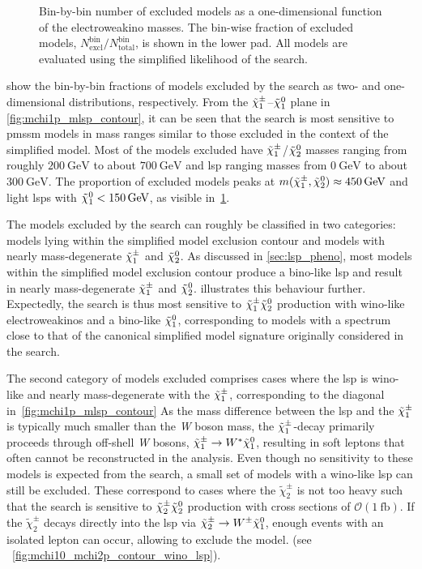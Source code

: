 \begin{figure}
\begin{subfigure}[b]{0.5\linewidth}
	\end{subfigure}\hfill
	\caption{Bin-by-bin number of excluded models as a one-dimensional function of the electroweakino masses. The bin-wise fraction of excluded models, $N^\mathrm{bin}_\mathrm{excl} / N^\mathrm{bin}_\mathrm{total}$, is shown in the lower pad. All models are evaluated using the simplified likelihood of the \onelepton search.}
	\label{fig:impact_electroweakinos_1D}
\end{figure}


 show the bin-by-bin fractions of models excluded by the \onelepton search as two- and one-dimensional distributions, respectively. From the $\tilde{\chi}_1^\pm$--$\tilde{\chi}_1^0$ plane in \cref{fig:mchi1p_mlsp_contour}, it can be seen that the \onelepton search is most sensitive to \gls{pmssm} models in mass ranges similar to those excluded in the context of the simplified model. Most of the models excluded have $\tilde{\chi}_1^\pm$/$\tilde{\chi}_2^0$ masses ranging from roughly $\SI{200}{\GeV}$ to about $\SI{700}{\GeV}$ and \gls{lsp} ranging masses from $\SI{0}{\GeV}$ to about $\SI{300}{\GeV}$. The proportion of excluded models peaks at $m(\charg,\neutr) \approx \SI{450}{\GeV}$ and light \glspl{lsp} with $\lsp < \SI{150}{\GeV}$, as visible in~\cref{fig:impact_electroweakinos_1D}. 

The models excluded by the \onelepton search can roughly be classified in two categories: models lying within the simplified model exclusion contour and models with nearly mass-degenerate $\tilde{\chi}_1^\pm$ and $\tilde{\chi}_2^0$. As discussed in \cref{sec:lsp_pheno}, most models within the simplified model exclusion contour produce a bino-like \gls{lsp} and result in nearly mass-degenerate $\tilde{\chi}_1^\pm$ and $\tilde{\chi}_2^0$.  illustrates this behaviour further. Expectedly, the \onelepton search is thus most sensitive to $\tilde{\chi}_1^\pm\tilde{\chi}_2^0$ production with wino-like electroweakinos and a bino-like $\tilde{\chi}_1^0$, corresponding to models with a spectrum close to that of the canonical simplified model signature originally considered in the search. 

The second category of models excluded comprises cases where the \gls{lsp} is wino-like and nearly mass-degenerate with the $\tilde{\chi}_1^\pm$, corresponding to the diagonal in~\cref{fig:mchi1p_mlsp_contour} As the mass difference between the \gls{lsp} and the $\tilde{\chi}_1^\pm$ is typically much smaller than the \textit{W} boson mass, the $\tilde{\chi}_1^\pm$-decay  primarily proceeds through off-shell \textit{W} bosons, $\tilde{\chi}_1^\pm \rightarrow W^* \tilde{\chi}_1^0$, resulting in soft leptons that often cannot be reconstructed in the analysis. Even though no sensitivity to these models is expected from the \onelepton search, a small set of models with a wino-like \gls{lsp} can still be excluded. These correspond to cases where the $\tilde{\chi}^\pm_2$ is not too heavy such that the \onelepton search is sensitive to $\tilde{\chi}^\pm_2\tilde{\chi}_2^0$ production with cross sections of $\mathcal{O}(\SI{1}{\femto\barn})$. If the $\tilde{\chi}^\pm_2$ decays directly into the \gls{lsp} via $\tilde{\chi}^\pm_2 \rightarrow W^\pm \tilde{\chi}_1^0$, enough events with an isolated lepton can occur, allowing to exclude the model. (see \eg~\cref{fig:mchi10_mchi2p_contour_wino_lsp}).

